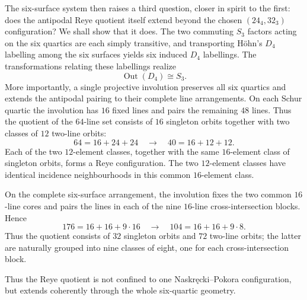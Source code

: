 \documentclass[10pt]{article}
\begin{document}
The six-surface system then raises a third question, closer in spirit to the
first: does the antipodal Reye quotient itself extend beyond the chosen
$(24_4,32_3)$ configuration?  We shall show that it does. The two commuting
$S_3$ factors acting on the six quartics are each simply transitive, and
transporting H\"ohn's $D_4$ labelling among the six surfaces yields six
induced $D_4$ labellings.  The transformations relating these labellings
realize
\[
\operatorname{Out}(D_4)\cong S_3.
\]
More importantly, a single projective
involution preserves all six quartics and extends the antipodal pairing to
their complete line arrangements. On each Schur quartic the involution has $16$ fixed lines and pairs the
remaining $48$ lines.  Thus the quotient of the $64$-line set consists of
$16$ singleton orbits together with two classes of $12$ two-line orbits:
\[
64=16+24+24
\quad\longrightarrow\quad
40=16+12+12.
\]
Each of the two $12$-element classes, together with the same
$16$-element class of singleton orbits, forms a Reye configuration.
The two $12$-element classes have identical incidence neighbourhoods
in this common $16$-element class.

On the complete six-surface arrangement, the involution fixes the two
common $16$-line cores and pairs the lines in each of the nine
$16$-line cross-intersection blocks.  Hence
\[
176=16+16+9\cdot16
\quad\longrightarrow\quad
104=16+16+9\cdot8.
\]
Thus the quotient consists of $32$ singleton orbits and $72$ two-line
orbits; the latter are naturally grouped into nine classes of eight,
one for each cross-intersection block.

Thus the Reye quotient is not confined to one Naskr\k{e}cki--Pokora
configuration, but extends coherently through the whole six-quartic geometry.
\end{document}
